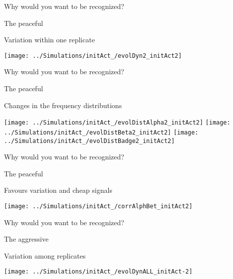 \documentclass[
  ignorenonframetext,
]{beamer}
\begin{document}
\begin{frame}{Why would you want to be recognized?}
\protect\hypertarget{why-would-you-want-to-be-recognized-2}{}

\begin{block}{The peaceful}

Variation within one replicate

\begin{flushleft}\texttt{[image: ../Simulations/initAct\_/evolDyn2\_initAct2]} \end{flushleft}

\end{block}

\end{frame}

\begin{frame}{Why would you want to be recognized?}
\protect\hypertarget{why-would-you-want-to-be-recognized-3}{}

\begin{block}{The peaceful}

Changes in the frequency distributions

\begin{flushleft}\texttt{[image: ../Simulations/initAct\_/evolDistAlpha2\_initAct2]} \texttt{[image: ../Simulations/initAct\_/evolDistBeta2\_initAct2]} \texttt{[image: ../Simulations/initAct\_/evolDistBadge2\_initAct2]} \end{flushleft}

\end{block}

\end{frame}

\begin{frame}{Why would you want to be recognized?}
\protect\hypertarget{why-would-you-want-to-be-recognized-4}{}

\begin{block}{The peaceful}

Favours variation and cheap signals

\begin{flushleft}\texttt{[image: ../Simulations/initAct\_/corrAlphBet\_initAct2]} \end{flushleft}

\end{block}

\end{frame}

\begin{frame}{Why would you want to be recognized?}
\protect\hypertarget{why-would-you-want-to-be-recognized-5}{}

\begin{block}{The aggressive}

Variation among replicates

\begin{flushleft}\texttt{[image: ../Simulations/initAct\_/evolDynALL\_initAct-2]} \end{flushleft}

\end{block}

\end{frame}
\end{document}
